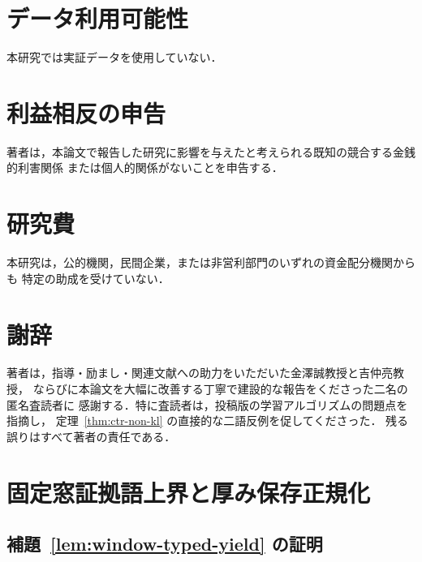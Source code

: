\documentclass[11pt,a4paper]{ltjsarticle}
\theoremstyle{remark}
\theoremstyle{plain}
\begin{document}
\section*{データ利用可能性}
本研究では実証データを使用していない．

\section*{利益相反の申告}
著者は，本論文で報告した研究に影響を与えたと考えられる既知の競合する金銭的利害関係
または個人的関係がないことを申告する．

\section*{研究費}
本研究は，公的機関，民間企業，または非営利部門のいずれの資金配分機関からも
特定の助成を受けていない．

\section*{謝辞}
著者は，指導・励まし・関連文献への助力をいただいた金澤誠教授と吉仲亮教授，
ならびに本論文を大幅に改善する丁寧で建設的な報告をくださった二名の匿名査読者に
感謝する．特に査読者は，投稿版の学習アルゴリズムの問題点を指摘し，
定理~\ref{thm:ctr-non-kl} の直接的な二語反例を促してくださった．
残る誤りはすべて著者の責任である．

\appendix
\section{固定窓証拠語上界と厚み保存正規化}
\label{app:fixed-window-bounds}

\subsection{補題~\ref{lem:window-typed-yield} の証明}
\end{document}
